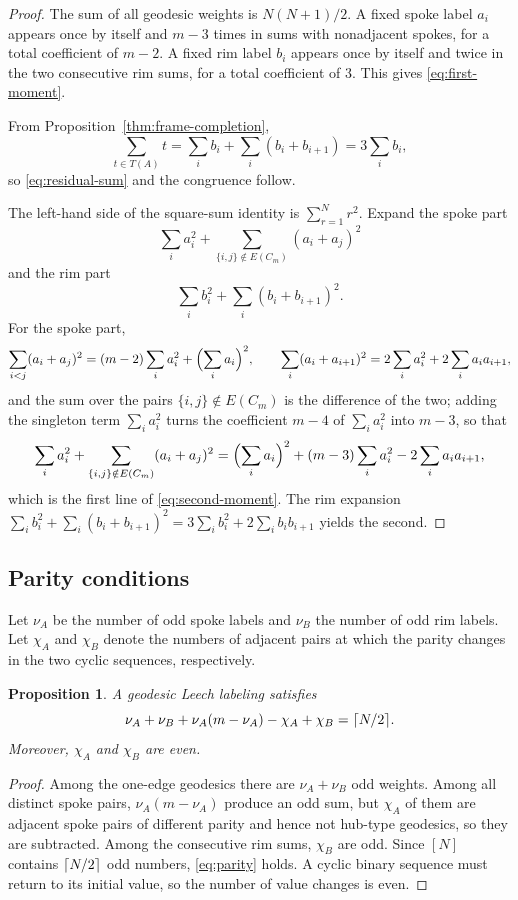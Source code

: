 \documentclass[11pt]{article}
\newtheorem{proposition}[theorem]{Proposition}
\theoremstyle{definition}
\theoremstyle{remark}
\numberwithin{equation}{section}
\DeclarePairedDelimiter{\ceil}{\lceil}{\rceil}
\begin{document}
\begin{proof}
The sum of all geodesic weights is $N(N+1)/2$. A fixed spoke label $a_i$ appears once by itself and $m-3$ times in sums with nonadjacent spokes, for a total coefficient of $m-2$. A fixed rim label $b_i$ appears once by itself and twice in the two consecutive rim sums, for a total coefficient of $3$. This gives \eqref{eq:first-moment}.

From Proposition~\ref{thm:frame-completion},
\[
  \sum_{t\in T(A)}t
  =\sum_i b_i+\sum_i(b_i+b_{i+1})
  =3\sum_i b_i,
\]
so \eqref{eq:residual-sum} and the congruence follow.

The left-hand side of the square-sum identity is $\sum_{r=1}^N r^2$. Expand the spoke part
\[
  \sum_i a_i^2+
  \sum_{\{i,j\}\notin E(C_m)}(a_i+a_j)^2
\]
and the rim part
\[
  \sum_i b_i^2+
  \sum_i(b_i+b_{i+1})^2.
\]
For the spoke part,
\[
  \sum_{i<j}(a_i+a_j)^2=(m-2)\sum_ia_i^2+\Bigl(\sum_ia_i\Bigr)^2,
  \qquad
  \sum_i(a_i+a_{i+1})^2=2\sum_ia_i^2+2\sum_ia_ia_{i+1},
\]
and the sum over the pairs $\{i,j\}\notin E(C_m)$ is the difference of the two;
adding the singleton term $\sum_ia_i^2$ turns the coefficient $m-4$ of
$\sum_ia_i^2$ into $m-3$, so that
\[
  \sum_ia_i^2+\sum_{\{i,j\}\notin E(C_m)}(a_i+a_j)^2
  =\Bigl(\sum_ia_i\Bigr)^2+(m-3)\sum_ia_i^2-2\sum_ia_ia_{i+1},
\]
which is the first line of \eqref{eq:second-moment}. The rim expansion
$\sum_ib_i^2+\sum_i(b_i+b_{i+1})^2=3\sum_ib_i^2+2\sum_ib_ib_{i+1}$ yields the
second.
\end{proof}

\subsection{Parity conditions}

Let $\nu_A$ be the number of odd spoke labels and $\nu_B$ the number of odd rim labels. Let $\chi_A$ and $\chi_B$ denote the numbers of adjacent pairs at which the parity changes in the two cyclic sequences, respectively.

\begin{proposition}\label{prop:parity}
A geodesic Leech labeling satisfies
\begin{equation}\label{eq:parity}
  \nu_A+\nu_B+\nu_A(m-\nu_A)-\chi_A+\chi_B=\ceil{N/2}.
\end{equation}
Moreover, $\chi_A$ and $\chi_B$ are even.
\end{proposition}

\begin{proof}
Among the one-edge geodesics there are $\nu_A+\nu_B$ odd weights. Among all distinct spoke pairs, $\nu_A(m-\nu_A)$ produce an odd sum, but $\chi_A$ of them are adjacent spoke pairs of different parity and hence not hub-type geodesics, so they are subtracted. Among the consecutive rim sums, $\chi_B$ are odd. Since $[N]$ contains $\ceil{N/2}$ odd numbers, \eqref{eq:parity} holds. A cyclic binary sequence must return to its initial value, so the number of value changes is even.
\end{proof}
\end{document}
